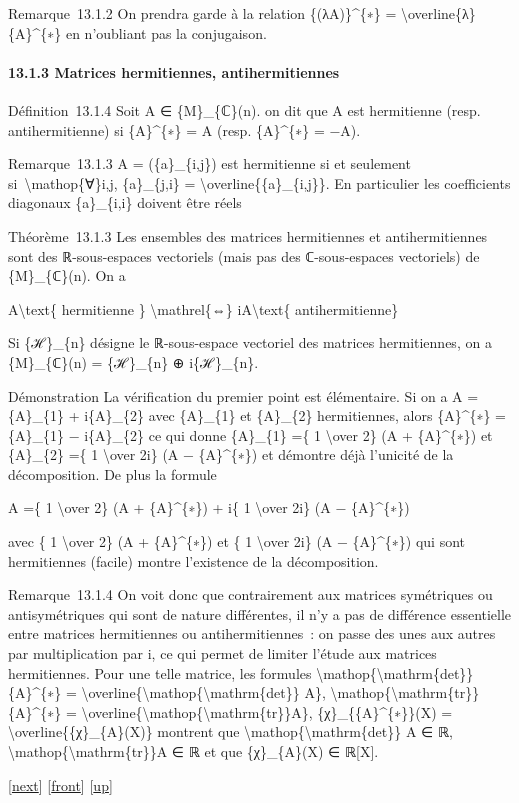 \documentclass[]{article}
\begin{document}
Remarque~13.1.2 On prendra garde à la relation \{(λA)\}\^{}\{∗\} =
\textbackslash{}overline\{λ\}\{A\}\^{}\{∗\} en n'oubliant pas la
conjugaison.

\paragraph{13.1.3 Matrices hermitiennes, antihermitiennes}

Définition~13.1.4 Soit A ∈ \{M\}\_\{ℂ\}(n). on dit que A est hermitienne
(resp. antihermitienne) si \{A\}\^{}\{∗\} = A (resp. \{A\}\^{}\{∗\} =
−A).

Remarque~13.1.3 A = (\{a\}\_\{i,j\}) est hermitienne si et seulement
si~\textbackslash{}mathop\{∀\}i,j, \{a\}\_\{j,i\} =
\textbackslash{}overline\{\{a\}\_\{i,j\}\}. En particulier les
coefficients diagonaux \{a\}\_\{i,i\} doivent être réels

Théorème~13.1.3 Les ensembles des matrices hermitiennes et
antihermitiennes sont des ℝ-sous-espaces vectoriels (mais pas des
ℂ-sous-espaces vectoriels) de \{M\}\_\{ℂ\}(n). On a

A\textbackslash{}text\{ hermitienne \} \textbackslash{}mathrel\{⇔\}
iA\textbackslash{}text\{ antihermitienne\}

Si \{ℋ\}\_\{n\} désigne le ℝ-sous-espace vectoriel des matrices
hermitiennes, on a \{M\}\_\{ℂ\}(n) = \{ℋ\}\_\{n\} ⊕ i\{ℋ\}\_\{n\}.

Démonstration La vérification du premier point est élémentaire. Si on a
A = \{A\}\_\{1\} + i\{A\}\_\{2\} avec \{A\}\_\{1\} et \{A\}\_\{2\}
hermitiennes, alors \{A\}\^{}\{∗\} = \{A\}\_\{1\} − i\{A\}\_\{2\} ce qui
donne \{A\}\_\{1\} =\{ 1 \textbackslash{}over 2\} (A + \{A\}\^{}\{∗\})
et \{A\}\_\{2\} =\{ 1 \textbackslash{}over 2i\} (A − \{A\}\^{}\{∗\}) et
démontre déjà l'unicité de la décomposition. De plus la formule

A =\{ 1 \textbackslash{}over 2\} (A + \{A\}\^{}\{∗\}) + i\{ 1
\textbackslash{}over 2i\} (A − \{A\}\^{}\{∗\})

avec \{ 1 \textbackslash{}over 2\} (A + \{A\}\^{}\{∗\}) et \{ 1
\textbackslash{}over 2i\} (A − \{A\}\^{}\{∗\}) qui sont hermitiennes
(facile) montre l'existence de la décomposition.

Remarque~13.1.4 On voit donc que contrairement aux matrices symétriques
ou antisymétriques qui sont de nature différentes, il n'y a pas de
différence essentielle entre matrices hermitiennes ou antihermitiennes~:
on passe des unes aux autres par multiplication par i, ce qui permet de
limiter l'étude aux matrices hermitiennes. Pour une telle matrice, les
formules \textbackslash{}mathop\{\textbackslash{}mathrm\{det\}\}
\{A\}\^{}\{∗\} =
\textbackslash{}overline\{\textbackslash{}mathop\{\textbackslash{}mathrm\{det\}\}
A\},
\textbackslash{}mathop\{\textbackslash{}mathrm\{tr\}\}\{A\}\^{}\{∗\} =
\textbackslash{}overline\{\textbackslash{}mathop\{\textbackslash{}mathrm\{tr\}\}A\},
\{χ\}\_\{\{A\}\^{}\{∗\}\}(X) =
\textbackslash{}overline\{\{χ\}\_\{A\}(X)\} montrent que
\textbackslash{}mathop\{\textbackslash{}mathrm\{det\}\} A ∈ ℝ,
\textbackslash{}mathop\{\textbackslash{}mathrm\{tr\}\}A ∈ ℝ et que
\{χ\}\_\{A\}(X) ∈ ℝ{[}X{]}.

{[}\href{coursse74.html}{next}{]} {[}\href{coursse73.html}{front}{]}
{[}\href{coursch14.html\#coursse73.html}{up}{]}
\end{document}
